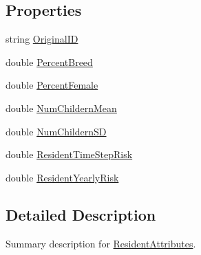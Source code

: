 \subsection*{Properties}
\begin{DoxyCompactItemize}
\item 
string \hyperlink{class_p_a_z___dispersal_1_1_resident_attributes_a9078eed5badeb0ed6c29f327c7a12bbd}{Original\-I\-D}
\item 
double \hyperlink{class_p_a_z___dispersal_1_1_resident_attributes_ab752dbadd564eadcce682097db791cf3}{Percent\-Breed}
\item 
double \hyperlink{class_p_a_z___dispersal_1_1_resident_attributes_a6100e76458f95b6300400008d5230184}{Percent\-Female}
\item 
double \hyperlink{class_p_a_z___dispersal_1_1_resident_attributes_a17ba8c7ebbc5e6d50d9e385a8ccc5a12}{Num\-Childern\-Mean}
\item 
double \hyperlink{class_p_a_z___dispersal_1_1_resident_attributes_a98161fe31cfb1199ea5f222ecfc34bce}{Num\-Childern\-S\-D}
\item 
double \hyperlink{class_p_a_z___dispersal_1_1_resident_attributes_afec2cb6352309d7cb6b3daac83752b9e}{Resident\-Time\-Step\-Risk}
\item 
double \hyperlink{class_p_a_z___dispersal_1_1_resident_attributes_a4727fe1ce57d5cbed0c093394c8991e7}{Resident\-Yearly\-Risk}
\end{DoxyCompactItemize}


\subsection{Detailed Description}
Summary description for \hyperlink{class_p_a_z___dispersal_1_1_resident_attributes}{Resident\-Attributes}. 



